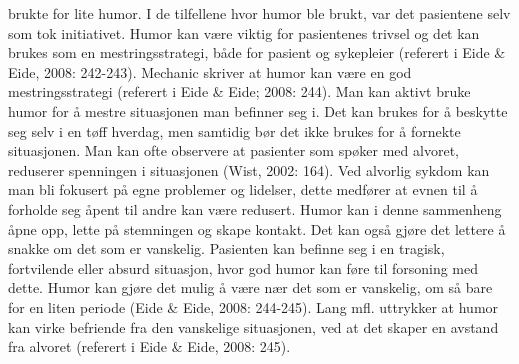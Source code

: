 brukte for lite humor. I de tilfellene hvor humor ble brukt, var det pasientene
selv som tok initiativet.  Humor kan være viktig for pasientenes trivsel og det
kan brukes som en mestringsstrategi, både for pasient og sykepleier (referert i
Eide \&{} Eide, 2008: 242-243).  Mechanic skriver at humor kan være en god
mestringsstrategi (referert i Eide \&{} Eide; 2008: 244). Man kan aktivt bruke
humor for å mestre situasjonen man befinner seg i. Det kan brukes for å
beskytte seg selv i en tøff hverdag, men samtidig bør det ikke brukes for å
fornekte situasjonen. Man kan ofte observere at pasienter som spøker med
alvoret, reduserer spenningen i situasjonen (Wist, 2002: 164).  Ved alvorlig
sykdom kan man bli fokusert på egne problemer og lidelser, dette medfører at
evnen til å forholde seg åpent til andre kan være redusert. Humor kan i denne
sammenheng åpne opp, lette på stemningen og skape kontakt. Det kan også gjøre
det lettere å snakke om det som er vanskelig. Pasienten kan befinne seg i en
tragisk, fortvilende eller absurd situasjon, hvor god humor kan føre til
forsoning med dette. Humor kan gjøre det mulig å være nær det som er vanskelig,
om så bare for en liten periode (Eide \&{} Eide, 2008: 244-245). Lang mfl.
uttrykker at humor kan virke befriende fra den vanskelige situasjonen, ved at
det skaper en avstand fra alvoret (referert i Eide \&{} Eide, 2008: 245).

